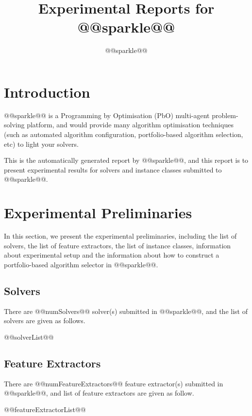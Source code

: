 \documentclass[british]{article}
\title{Experimental Reports for @@sparkle@@ }
\author{ @@sparkle@@ }
\begin{document}
\maketitle %


\section{Introduction}
\label{sec:Introduction}

@@sparkle@@ \cite{Hoos15} is a Programming by Optimisation (PbO) \cite{Hoos12} multi-agent problem-solving platform, and would provide many algorithm optimisation techniques (such as automated algorithm configuration, portfolio-based algorithm selection, etc) to light your solvers. 

This is the automatically generated report by @@sparkle@@, and this report is to present experimental results for solvers and instance classes submitted to @@sparkle@@.


\section{Experimental Preliminaries}
\label{sec:Experimental_Preliminaries}

In this section, we present the experimental preliminaries, including the list of solvers, the list of feature extractors, the list of instance classes, information about experimental setup and the information about how to construct a portfolio-based algorithm selector in @@sparkle@@.

\subsection{Solvers}
\label{sec:Solvers}
There are @@numSolvers@@ solver(s) submitted in @@sparkle@@, and the list of solvers are given as follows.


\begin{enumerate} 
@@solverList@@
\end{enumerate}


\subsection{Feature Extractors}
\label{sec:Feature_Extractors}
There are @@numFeatureExtractors@@ feature extractor(s) submitted in @@sparkle@@, and list of feature extractors are given as follow.

\begin{enumerate}
@@featureExtractorList@@
\end{enumerate}
\end{document}
